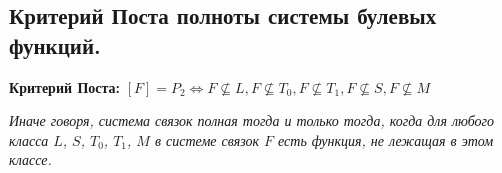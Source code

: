 \subsection{Критерий Поста полноты системы булевых функций.}

\textbf{Критерий Поста:} $[F] = P_2 \Leftrightarrow F \nsubseteq L, F \nsubseteq T_0, F \nsubseteq T_1, F \nsubseteq S, F \nsubseteq M$

\textit{Иначе говоря, система связок полная тогда и только тогда, когда для любого класса $L$, $S$, $T_0$, $T_1$, $M$ в системе связок $F$ есть функция, не лежащая в этом классе.}
